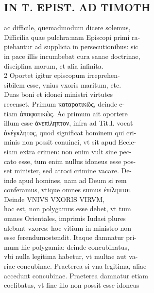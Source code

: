 \documentclass{article}
\begin{document}
\begin{pages}
\section*{IN T. EPIST. AD TIMOTH \\
                }
ac difficile, quemadmodum dicere solemus, \\
                Difficilia quae pulchra:nam Episcopi primi ra- \\
                piebantur ad supplicia in persecutionibus: sic \\
                in pace illis incumbebat cura sanae doctrinae, \\
                disciplina morum, et alia infinita. \\
                2 Oportet igitur episcopum irreprehen- \\
                sibilem esse, vnius vxoris maritum, etc. \\
                Duas boni et idonei ministri virtutes \\
                recenset. Primum καταρατικῶς, deinde e- \\
                tiam ἀποφατικῶς. Ac primum ait oportere \\
                illum esse ἀνεπίληπτον, infra ad Tit.I. vocat \\
                ἀνέγκλητος, quod significat hominem qui cri- \\
                minis non possit conuinci, vt sit apud Eccle- \\
                siam extra crimen: non enim vult sine pec- \\
                cato esse, tum enim nullus idoneus esse pos- \\
                set minister, sed atroci crimine vacare. De- \\
                inde apud homines, nam ad Deum si rem \\
                conferamus, vtique omnes sumus ἐπίληπτοι. \\
                Deinde VNIVS VXORIS VIRVM, \\
                hoc est, non polygamus esse debet, vt tum \\
                omnes Orientales, imprimis Iudaei plures \\
                alebant vxores: hoc vitium in ministro non \\
                esse ferendumostendit. Itaque damnatur pri- \\
                mum hic polygamia: deinde concubinatus, \\
                vbi nulla legitima habetur, vt multae aut va- \\
                riae concubinae. Praeterea si vna legitima, aliae \\
                accedunt concubinae. Praeterea damnatur etiam \\
                coelibatus, vt fine illo non possit esse idoneus \\
                

\end{pages}
\end{document}
